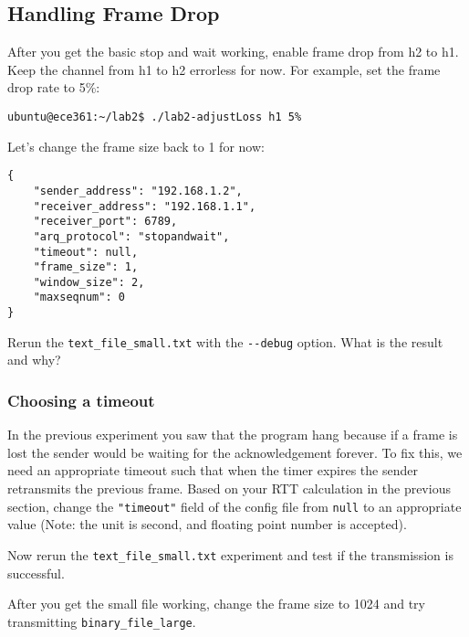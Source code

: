 \documentclass[11pt]{article}
\begin{document}
\subsection{Handling Frame Drop}
After you get the basic stop and wait working, enable frame drop from h2 to h1. Keep the channel from h1 to h2 errorless for now. For example, set the frame drop rate to 5\%:
\begin{lstlisting}[style=ece361-shell-base, caption={}]
ubuntu@ece361:~/lab2$ ./lab2-adjustLoss h1 5%
\end{lstlisting}
Let's change the frame size back to 1 for now:

\begin{lstlisting}[style=ece361-shell-base, caption={Configuration For Large File}]
{
    "sender_address": "192.168.1.2",
    "receiver_address": "192.168.1.1",
    "receiver_port": 6789,
    "arq_protocol": "stopandwait",
    "timeout": null,
    "frame_size": 1,
    "window_size": 2,
    "maxseqnum": 0
}
\end{lstlisting}

Rerun the \texttt{text\_file\_small.txt} with the \texttt{-{}-debug} option. What is the result and why?

\subsubsection {Choosing a timeout}
In the previous experiment you saw that the program hang because if a frame is lost the sender would be waiting for the acknowledgement forever.
To fix this, we need an appropriate timeout such that when the timer expires the sender retransmits the previous frame.
Based on your RTT calculation in the previous section, change the \texttt{"timeout"} field of the config file from \texttt{null} to an appropriate value (Note: the unit is second, and floating point number is accepted).


\noindent Now rerun the \texttt{text\_file\_small.txt} experiment and test if the transmission is successful.

\noindent After you get the small file working, change the frame size to 1024 and try transmitting \texttt{binary\_file\_large}.

\end{document}
